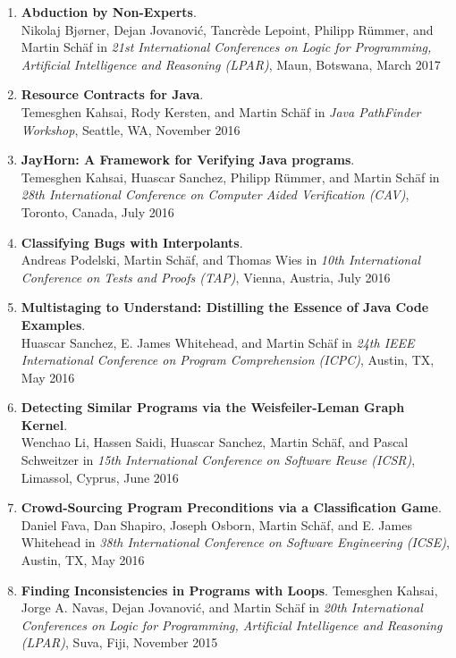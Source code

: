 \begin{enumerate}
\item \textbf{Abduction by Non-Experts}.
\\ Nikolaj Bj{\o}rner, Dejan Jovanovi\'c, Tancr\`ede Lepoint, Philipp R\"ummer, and Martin Sch\"af in 
\emph{21st International Conferences on Logic for Programming, Artificial Intelligence and Reasoning (LPAR)},
Maun, Botswana, March 2017


\item \textbf{Resource Contracts for Java}.
\\ Temesghen Kahsai, Rody Kersten, and Martin Sch\"af in 
\emph{Java PathFinder Workshop},
Seattle, WA, November 2016

\item \textbf{JayHorn: A Framework for Verifying Java programs}.
\\ Temesghen Kahsai, Huascar Sanchez, Philipp R\"ummer, and Martin Sch\"af in 
\emph{28th International Conference on Computer Aided Verification (CAV)},
Toronto, Canada, July 2016


\item \textbf{Classifying Bugs with Interpolants}.
\\ Andreas Podelski, Martin Sch\"af, and Thomas Wies in 
\emph{10th International Conference on Tests and Proofs (TAP)},
Vienna, Austria, July 2016


\item \textbf{Multistaging to Understand: Distilling the Essence of Java Code Examples}.
\\ Huascar Sanchez, E. James Whitehead, and Martin Sch\"af in 
\emph{24th IEEE International Conference on Program Comprehension (ICPC)},
Austin, TX, May 2016


\item \textbf{Detecting Similar Programs via the Weisfeiler-Leman Graph Kernel}.
\\ Wenchao Li, Hassen Saidi, Huascar Sanchez, Martin Sch\"af, and Pascal
Schweitzer in \emph{15th International Conference on Software Reuse (ICSR)},
Limassol, Cyprus, June 2016


\item \textbf{Crowd-Sourcing Program Preconditions via a Classification Game}.
\\ Daniel Fava, Dan Shapiro, Joseph Osborn, Martin Sch\"af, and E. James
Whitehead in \emph{38th International Conference on Software Engineering (ICSE)}, Austin,
TX, May 2016


\item \textbf{Finding Inconsistencies in Programs with Loops}.
Temesghen Kahsai, Jorge A. Navas, Dejan Jovanovi\'c, and Martin Sch\"af
in \emph{20th International Conferences on Logic for Programming, Artificial Intelligence and Reasoning (LPAR)}, Suva, Fiji, November
2015


\end{enumerate}
